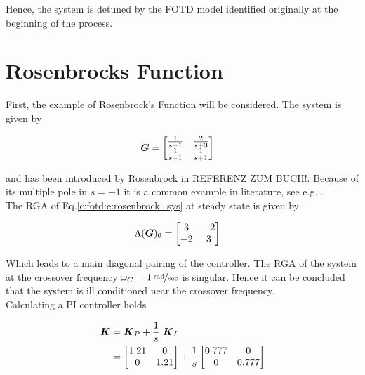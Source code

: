 Hence, the system is detuned by the FOTD model identified originally at the beginning of the process.

\section{Rosenbrocks Function}%
\label{c:fotd:s:rosenbrook}

First, the example of Rosenbrock's Function will be considered. The system is given by

\begin{align}
\begin{split}
\mbox{\boldmath$G$} &= \begin{bmatrix}
\frac{1}{s+1} & \frac{2}{s+3} \\
\frac{1}{s+1} & \frac{1}{s+1}
\end{bmatrix}
\end{split}
\label{c:fotd:e:rosenbrock_sys}
\end{align}

and has been introduced by Rosenbrock in REFERENZ ZUM BUCH!. Because of its multiple pole in $s=-1$ it is a common example in literature, see e.g. \cite{Astrom2001a}.\\

The RGA of Eq.\ref{c:fotd:e:rosenbrock_sys} at steady state is given by

\begin{align}
\begin{split}
\Lambda(\mbox{\boldmath$G$})_0 &= \begin{bmatrix}
3 & -2 \\
-2 & 3
\end{bmatrix} 
\end{split}
\label{c:fotd:e:rosenbrock_rga}
\end{align}

Which leads to a main diagonal pairing of the controller. The RGA of the system at the crossover frequency $\omega_C =  \unitfrac[1]{rad}{sec}$ is singular. Hence it can be concluded that the system is ill conditioned near the crossover frequency. \\

Calculating a PI controller holds

\begin{align}
\mbox{\boldmath$K$} &= \mbox{\boldmath$K$}_P + \frac{1}{s}~ \mbox{\boldmath$K$}_I\\
&= \begin{bmatrix}
1.21 & 0 \\
0 & 1.21
\end{bmatrix}
+ \frac{1}{s}\begin{bmatrix}
0.777 & 0 \\
0 & 0.777
\end{bmatrix}
\end{align}

